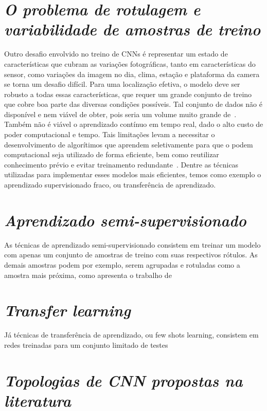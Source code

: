 \section{\textit{O problema de rotulagem e variabilidade de amostras de treino}}\label{sec:Cap2_MR}


Outro desafio envolvido no treino de CNNs é representar um estado de características que cubram as variações fotográficas, tanto em características do sensor, como variações da imagem no dia, clima, estação e plataforma da camera se torna um desafio difícil. Para uma localização efetiva, o modelo deve ser robusto a todas essas características, que requer um grande conjunto de treino que cobre boa parte das diversas condições possíveis. Tal conjunto de dados não é disponível e nem viável de obter, pois seria um volume muito grande de~\cite{rs13194017}. Também não é viável o aprendizado contínuo em tempo real, dado o alto custo de poder computacional e tempo. Tais limitações levam a necessitar o desenvolvimento de algorítimos que aprendem seletivamente para que o podem computacional seja utilizado de forma eficiente, bem como reutilizar conhecimento prévio e evitar treinamento redundante~\cite{rostami2019learning}.  Dentre as técnicas utilizadas para implementar esses modelos mais eficientes, temos como exemplo o aprendizado supervisionado fraco, ou transferência de aprendizado. 

\section{\textit{Aprendizado semi-supervisionado}}\label{sec:Cap2_MR}

As técnicas de aprendizado semi-supervisionado consistem em treinar um modelo com apenas um conjunto de amostras de treino com suas respectivos rótulos. As demais amostras podem por exemplo, serem agrupadas e rotuladas como a amostra mais próxima, como apresenta o trabalho de~\cite{Sanches2003}

\section{\textit{Transfer learning}}\label{sec:Cap2_MR}

Já técnicas de transferência de aprendizado, ou few shots learning, consistem em redes treinadas para um conjunto limitado de testes~\cite{rostami2019learning}

\section{\textit{Topologias de CNN propostas na literatura}}\label{sec:Cap2_MR}


